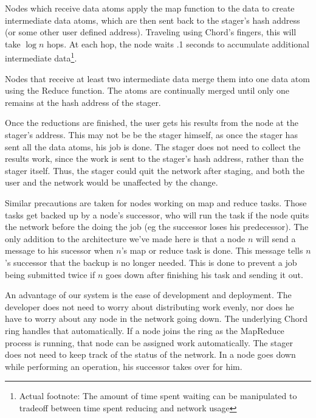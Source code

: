 \documentclass[conference, compsocconf, letterpaper]{IEEEtran}
\begin{document}
Nodes which receive data atoms apply the map function to the data to create intermediate data atoms, which are then sent back to the stager's hash address (or some other user defined address).  Traveling using Chord's fingers, this will take $\log n$ hops.  At each hop, the node waits .1 seconds to accumulate additional intermediate data\footnote{Actual footnote: The amount of time spent waiting can be manipulated to tradeoff between time spent reducing and network usage}.  

Nodes that receive at least two intermediate data merge them into one data atom using the Reduce function.   The atoms are continually merged until only one remains at the hash address of the stager. 

Once the reductions are finished, the user gets his results from the node at the stager's address.  This may not be be the stager himself, as once the stager has sent all the data atoms, his job is done.  The stager does not need to collect the results work, since the work is sent to the stager's hash address, rather than the stager itself.  Thus, the stager could quit the network after staging, and both the user and the network would be unaffected by the change. %

Similar precautions are taken for nodes working on map and reduce tasks.  Those tasks get backed up  by a node's successor, who will run the task if the node quits the network before the doing the job (eg the successor loses his predecessor).   The only addition to the architecture we've made here is that a node $n$ will send a message to his sucessor when  $n$'s map or reduce task is done.  This message tells $n$'s successor that the backup is no longer needed.  This is done to prevent a job being submitted twice if $n$ goes down after finishing his task and sending it out.



An advantage of our system is the ease of development and deployment.  The developer does not need to worry about distributing work evenly, nor does he have to worry about any node in the network going down.  The underlying Chord ring handles that automatically.  If a node joins the ring as the MapReduce process is running, that node can be assigned work automatically.  The stager does not need to keep track of the status of the network.  In a node goes down while performing an operation, his successor takes over for him.
\end{document}
